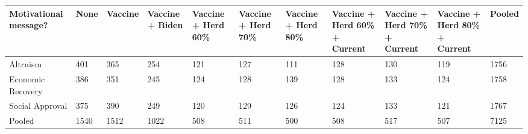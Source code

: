 \begin{table}[ht]
\centering
\begin{tabular}{lllllllllll}
  \hline
Motivational message? & None & Vaccine & Vaccine + Biden & Vaccine + Herd 60\% & Vaccine + Herd 70\% & Vaccine + Herd 80\% & Vaccine + Herd 60\% + Current & Vaccine + Herd 70\% + Current & Vaccine + Herd 80\% + Current & Pooled \\ 
  \hline
  Altruism & 401 & 365 & 254 & 121 & 127 & 111 & 128 & 130 & 119 & 1756 \\ 
  Economic Recovery & 386 & 351 & 245 & 124 & 128 & 139 & 128 & 133 & 124 & 1758 \\ 
  Social Approval & 375 & 390 & 249 & 120 & 129 & 126 & 124 & 133 & 121 & 1767 \\ 
  Pooled & 1540 & 1512 & 1022 & 508 & 511 & 500 & 508 & 517 & 507 & 7125 \\ 
   \hline
\end{tabular}
\end{table}
